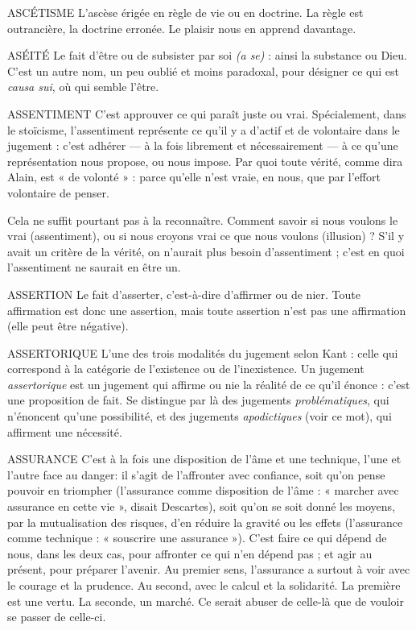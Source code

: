 ASCÉTISME L’ascèse érigée en règle de vie ou en doctrine. La règle est
outrancière, la doctrine erronée. Le plaisir nous en apprend
davantage.

ASÉITÉ Le fait d’être ou de subsister par soi {\it (a se)} : ainsi la substance ou
Dieu. C’est un autre nom, un peu oublié et moins paradoxal, pour
désigner ce qui est {\it causa sui}, où qui semble l’être.

ASSENTIMENT C’est approuver ce qui paraît juste ou vrai. Spécialement,
dans le stoïcisme, l’assentiment représente ce qu’il y a
d’actif et de volontaire dans le jugement : c’est adhérer — à la fois librement et
nécessairement — à ce qu’une représentation nous propose, ou nous impose.
Par quoi toute vérité, comme dira Alain, est « de volonté » : parce qu’elle n’est
vraie, en nous, que par l'effort volontaire de penser.

Cela ne suffit pourtant pas à la reconnaître. Comment savoir si nous voulons
le vrai (assentiment), ou si nous croyons vrai ce que nous voulons
(illusion) ? S'il y avait un critère de la vérité, on n’aurait plus besoin
d’assentiment ; c’est en quoi l’assentiment ne saurait en être un.

ASSERTION Le fait d’asserter, c’est-à-dire d’affirmer ou de nier. Toute affirmation
est donc une assertion, mais toute assertion n’est pas
une affirmation (elle peut être négative).

ASSERTORIQUE L’une des trois modalités du jugement selon Kant : celle
qui correspond à la catégorie de l’existence ou de l’inexistence.
Un jugement {\it assertorique} est un jugement qui affirme ou nie la réalité de
ce qu’il énonce : c’est une proposition de fait. Se distingue par là des jugements
{\it problématiques}, qui n’énoncent qu’une possibilité, et des jugements {\it apodictiques}
(voir ce mot), qui affirment une nécessité.

ASSURANCE C'est à la fois une disposition de l’âme et une technique, l’une
et l’autre face au danger: il s’agit de l’affronter avec
confiance, soit qu’on pense pouvoir en triompher (l’assurance comme disposition
de l’âme : « marcher avec assurance en cette vie », disait Descartes), soit
qu’on se soit donné les moyens, par la mutualisation des risques, d’en réduire
la gravité ou les effets (l’assurance comme technique : « souscrire une assurance »).
C’est faire ce qui dépend de nous, dans les deux cas, pour affronter ce
qui n’en dépend pas ; et agir au présent, pour préparer l'avenir.
Au premier sens, l’assurance a surtout à voir avec le courage et la prudence.
Au second, avec le calcul et la solidarité. La première est une vertu. La seconde,
un marché. Ce serait abuser de celle-là que de vouloir se passer de celle-ci.

